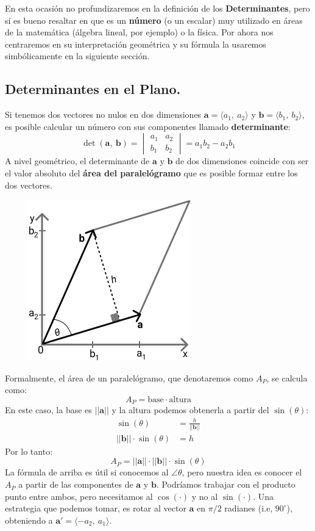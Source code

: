 \documentclass[12pt]{article}
\begin{document}
En esta ocasión no profundizaremos en la definición de los \textbf{Determinantes}, pero sí es bueno resaltar en que es un \textbf{número} (o un escalar) muy utilizado en áreas de la matemática (álgebra lineal, por ejemplo) o la física. Por ahora nos centraremos en su interpretación geométrica y su fórmula la usaremos simbólicamente en la siguiente sección.

\subsection{Determinantes en el Plano.}

Si tenemos dos vectores no nulos en dos dimensiones $\mathbf{a} = \langle a_{1}, \ a_{2} \rangle$ y $\mathbf{b} = \langle b_{1}, \ b_{2} \rangle$, es posible calcular un número con sus componentes llamado \textbf{determinante}:
\[
\det(\mathbf{a}, \ \mathbf{b}) =
  \begin{vmatrix}
  a_{1} & a_{2} \\
  b_{1} & b_{2}
  \end{vmatrix} =
  a_{1}b_{2} - a_{2}b_{1}
\]
A nivel geométrico, el determinante de $\mathbf{a}$ y $\mathbf{b}$ de dos dimensiones coincide con ser el valor absoluto del \textbf{área del paralelógramo} que es posible formar entre los dos vectores.

\begin{figure}[hbt!]
\centering
\includegraphics[scale=0.6]{img/det-area-parallelog-1.jpg}
\end{figure}

Formalmente, el área de un paralelógramo, que denotaremos como $A_{P}$, se calcula como:
\[
  A_{P} = \text{base} \cdot \text{altura}
\]
En este caso, la base es $||\mathbf{a}||$ y la altura podemos obtenerla a partir del $\sin(\theta)$:
\begin{align*}
  \sin(\theta) &= \frac{h}{||\mathbf{b}||} \\
  ||\mathbf{b}|| \cdot \sin(\theta) &= h
\end{align*}
Por lo tanto:
\[
  A_{P} = ||\mathbf{a}|| \cdot ||\mathbf{b}|| \cdot \sin(\theta)
\]
La fórmula de arriba es útil si conocemos al $\angle \theta$, pero nuestra idea es conocer el $A_{P}$ a partir de las componentes de $\mathbf{a}$ y $\mathbf{b}$. Podríamos trabajar con el producto punto entre ambos, pero necesitamos al $\cos(\cdot)$ y no al $\sin(\cdot)$. Una estrategia que podemos tomar, es rotar al vector $\mathbf{a}$ en $\pi/2$ radianes (i.e, $90^{\circ}$), obteniendo a $\mathbf{a}' = \langle -a_{2}, \ a_{1} \rangle$.
\end{document}
